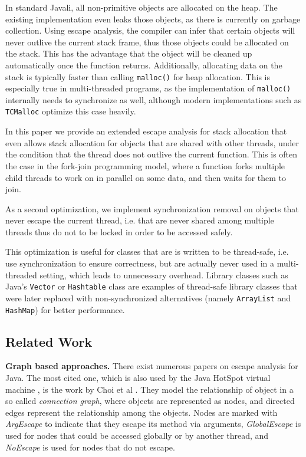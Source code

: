 \documentclass[letterpaper]{article}
\newcommand{\mypar}[1]{{\bf #1.}}
\begin{document}
In standard Javali, all non-primitive objects are allocated on the heap. The
existing implementation even leaks those objects, as there is currently on
garbage collection. Using escape analysis, the compiler can infer that certain
objects will never outlive the current stack frame, thus those objects could
be allocated on the stack. This has the advantage that the object will be cleaned
up automatically once the function returns. Additionally, allocating data on the
stack is typically faster than calling \texttt{malloc()} for heap allocation.
This is especially true in multi-threaded programs, as the implementation of
\texttt{malloc()} internally needs to synchronize as well, although modern
implementations such as \texttt{TCMalloc} \cite{TCMalloc} optimize this case heavily.

In this paper we provide an extended escape analysis for stack allocation that
even allows stack allocation for objects that are shared with other threads,
under the condition that the thread does not outlive the current function.
This is often the case in the fork-join programming model, where a function
forks multiple child threads to work on in parallel on some data, and then
waits for them to join.

As a second optimization, we implement synchronization removal on objects that
never escape the current thread, i.e. that are never shared among multiple threads
thus do not to be locked in order to be accessed safely. 

This optimization is useful for classes that are is written to be thread-safe,
i.e. use synchronization to ensure correctness, but are actually never used
in a multi-threaded setting, which leads to unnecessary overhead. Library
classes such as Java's \texttt{Vector} or \texttt{Hashtable} class are examples
of thread-safe library classes that were later replaced with non-synchronized
alternatives (namely \texttt{ArrayList} and \texttt{HashMap}) for better
performance.

\subsection{Related Work}

\mypar{Graph based approaches}
There exist numerous papers on escape analysis for Java. The most cited one,
which is also used by the Java HotSpot virtual machine \cite{HotSpot}, is the work by
Choi et al \cite{Choi:99}. They model the relationship of object in a so called
\emph{connection graph}, where objects are represented as nodes, and directed
edges represent the relationship among the objects. Nodes are marked with \emph{ArgEscape}
to indicate that they escape its method via arguments, \emph{GlobalEscape} is used
for nodes that could be accessed globally or by another thread, and \emph{NoEscape}
is used for nodes that do not escape.
\end{document}
